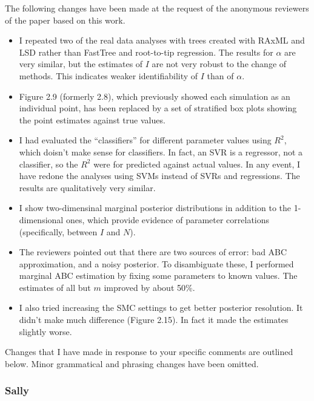 \documentclass[12pt]{article}
\begin{document}
The following changes have been made at the request of the anonymous reviewers 
of the paper based on this work. \\

\begin{itemize}
  \item I repeated two of the real data analyses with trees created with RAxML
    and LSD rather than FastTree and root-to-tip regression. The results for
    $\alpha$ are very similar, but the estimates of $I$ are not very robust to
    the change of methods. This indicates weaker identifiability of $I$ than of
    $\alpha$.
  \item Figure 2.9 (formerly 2.8), which previously showed each simulation as
    an individual point, has been replaced by a set of stratified box plots
    showing the point estimates against true values.
  \item I had evaluated the ``classifiers'' for different parameter values
    using $R^2$, which doisn't make sense for classifiers. In fact, an SVR is a
    regressor, not a classifier, so the $R^2$ were for predicted against actual
    values. In any event, I have redone the analyses using SVMs instead of SVRs
    and regressions. The results are qualitatively very similar.
  \item I show two-dimensinal marginal posterior distributions in addition to
    the 1-dimensional ones, which provide evidence of parameter correlations
    (specifically, between $I$ and $N$).
  \item The reviewers pointed out that there are two sources of error: bad ABC
    approximation, and a noisy posterior. To disambiguate these, I performed
    marginal ABC estimation by fixing some parameters to known values. The
    estimates of all but $m$ improved by about 50\%.
  \item I also tried increasing the SMC settings to get better posterior
    resolution. It didn't make much difference (Figure 2.15). In fact it made
    the estimates slightly worse.
\end{itemize}

Changes that I have made in response to your specific comments are outlined
below. Minor grammatical and phrasing changes have been omitted. \\

\subsubsection*{Sally}
\end{document}
